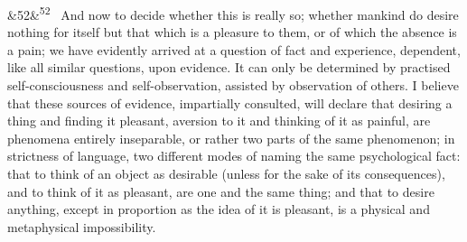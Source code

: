 \documentclass[12pt]{article}
\newcommand{\para}[1][]{\par\noindent\ifx&#1&\else\textsuperscript{\footnotesize #1}~\fi}
\begin{document}
\para[52] And now to decide whether this is really so; whether mankind do desire nothing for itself but that which is a pleasure to them, or of which the absence is a pain; we have evidently arrived at a question of fact and experience, dependent, like all similar questions, upon evidence. It can only be determined by practised self-consciousness and self-observation, assisted by observation of others. I believe that these sources of evidence, impartially consulted, will declare that desiring a thing and finding it pleasant, aversion to it and thinking of it as painful, are phenomena entirely inseparable, or rather two parts of the same phenomenon; in strictness of language, two different modes of naming the same psychological fact: that to think of an object as desirable (unless for the sake of its consequences), and to think of it as pleasant, are one and the same thing; and that to desire anything, except in proportion as the idea of it is pleasant, is a physical and metaphysical impossibility.
\end{document}
